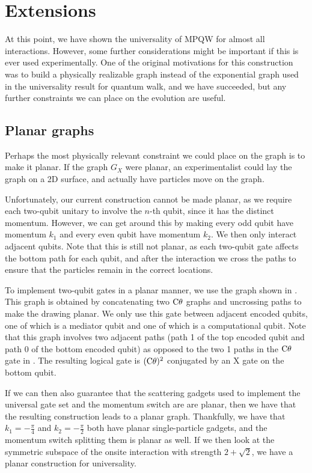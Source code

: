 \documentclass[../thesis-main/thesis-main]{subfiles}
\begin{document}
\section{Extensions}

At this point, we have shown the universality of MPQW for almost all interactions.  However, some further considerations might be important if this is ever used experimentally.  One of the original motivations for this construction was to build a physically realizable graph instead of the exponential graph used in the universality result for quantum walk, and we have succeeded, but any further constraints we can place on the evolution are useful.

\subsection{Planar graphs}

Perhaps the most physically relevant constraint we could place on the graph is to make it planar.  If the graph $G_X$ were planar, an experimentalist could lay the graph on a 2D surface, and actually have particles move on the graph.

Unfortunately, our current construction cannot be made planar, as we require each two-qubit unitary to involve the $n$-th qubit, since it has the distinct momentum.  However, we can get around this by making every odd qubit have momentum $k_1$ and every even qubit have momentum $k_2$.  We then only interact adjacent qubits.  Note that this is still not planar, as each two-qubit gate affects the bottom path for each qubit, and after the interaction we cross the paths to ensure that the particles remain in the correct locations.

To implement two-qubit gates in a planar manner, we use the graph shown in . This graph is obtained by concatenating two $\mathrm{C}\theta$ graphs and uncrossing paths to make the drawing planar. We only use this gate between adjacent encoded qubits, one of which is a mediator qubit and one of which is a computational qubit.  Note that this graph involves two adjacent paths (path 1 of the top encoded qubit and path 0 of the bottom encoded qubit) as opposed to the two 1 paths in the $\mathrm{C}\theta$ gate in . The resulting logical gate is $(\mathrm{C}\theta)^2$ conjugated by an X gate on the bottom qubit. 

If we can then also guarantee that the scattering gadgets used to implement the universal gate set and the momentum switch are  are planar, then we have that the resulting construction leads to a planar graph.  Thankfully, we have that $k_1 = -\frac{\pi}{4}$ and $k_2 = -\frac{\pi}{2}$ both have planar single-particle gadgets, and the momentum switch splitting them is planar as well.  If we then look at the symmetric subspace of the onsite interaction with strength $2+\sqrt{2}$, we have a planar construction for universality.
\end{document}
